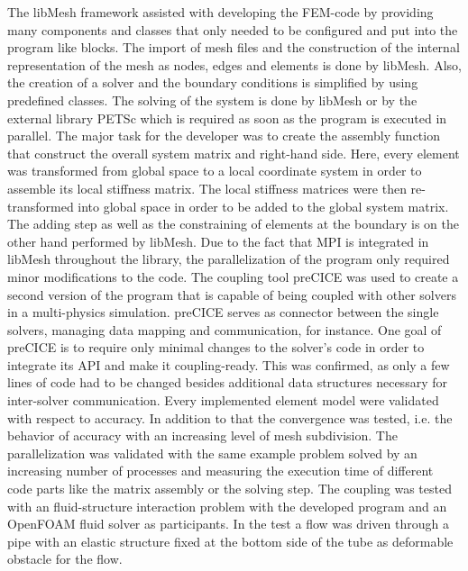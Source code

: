   The libMesh framework assisted with developing the FEM-code by providing many components and classes that only needed to be configured and put into the program like blocks. The import of mesh files and the construction of the internal representation of the mesh as nodes, edges and elements is done by libMesh. Also, the creation of a solver and the boundary conditions is simplified by using predefined classes. The solving of the system is done by libMesh or by the external library PETSc which is required as soon as the program is executed in parallel. The major task for the developer was to create the assembly function that construct the overall system matrix and right-hand side. Here, every element was transformed from global space to a local coordinate system in order to assemble its local stiffness matrix. The local stiffness matrices were then re-transformed into global space in order to be added to the global system matrix. The adding step as well as the constraining of elements at the boundary is on the other hand performed by libMesh. Due to the fact that MPI is integrated in libMesh throughout the library, the parallelization of the program only required minor modifications to the code.
  The coupling tool preCICE was used to create a second version of the program that is capable of being coupled with other solvers in a multi-physics simulation. preCICE serves as connector between the single solvers, managing data mapping and communication, for instance. One goal of preCICE is to require only minimal changes to the solver's code in order to integrate its API and make it coupling-ready. This was confirmed, as only a few lines of code had to be changed besides additional data structures necessary for inter-solver communication.
  Every implemented element model were validated with respect to accuracy. In addition to that the convergence was tested, i.e. the behavior of accuracy with an increasing level of mesh subdivision. The parallelization was validated with the same example problem solved by an increasing number of processes and measuring the execution time of different code parts like the matrix assembly or the solving step. The coupling was tested with an fluid-structure interaction problem with the developed program and an OpenFOAM fluid solver as participants. In the test a flow was driven through a pipe with an elastic structure fixed at the bottom side of the tube as deformable obstacle for the flow.
 

